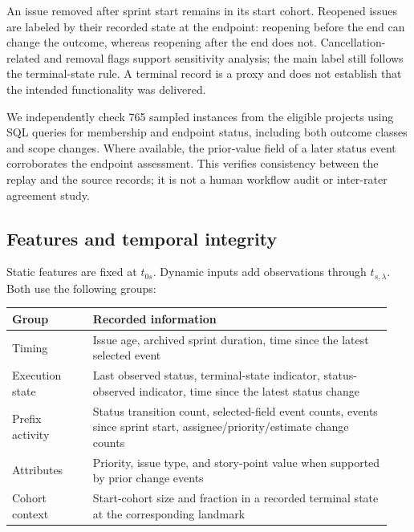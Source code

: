 \documentclass[11pt,a4paper]{article}
\begin{document}
An issue removed after sprint start remains in its start cohort. Reopened issues are labeled by their recorded state at the endpoint: reopening before the end can change the outcome, whereas reopening after the end does not. Cancellation-related and removal flags support sensitivity analysis; the main label still follows the terminal-state rule. A terminal record is a proxy and does not establish that the intended functionality was delivered.

We independently check 765 sampled instances from the eligible projects using SQL queries for membership and endpoint status, including both outcome classes and scope changes. Where available, the prior-value field of a later status event corroborates the endpoint assessment. This verifies consistency between the replay and the source records; it is not a human workflow audit or inter-rater agreement study.

\subsection{Features and temporal integrity}\label{features-and-temporal-integrity}

Static features are fixed at \(t_{0s}\). Dynamic inputs add observations through \(t_{s,\lambda}\). Both use the following groups:

{\def\LTcaptype{table}
\begin{table}[htbp]
\centering\footnotesize\setlength{\tabcolsep}{4pt}
\begin{tabular}{@{}p{0.20\linewidth}p{0.74\linewidth}@{}}
\toprule
Group & Recorded information \\
\midrule
Timing & Issue age, archived sprint duration, time since the latest selected event \\
Execution state & Last observed status, terminal-state indicator, status-observed indicator, time since the latest status change \\
Prefix activity & Status transition count, selected-field event counts, events since sprint start, assignee/priority/estimate change counts \\
Attributes & Priority, issue type, and story-point value when supported by prior change events \\
Cohort context & Start-cohort size and fraction in a recorded terminal state at the corresponding landmark \\
\bottomrule
\end{tabular}
\end{table}

}
\end{document}
